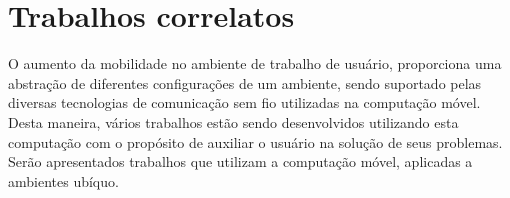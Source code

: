 \section{Trabalhos correlatos}
\label{sec:trabalhosRelacionados}

	O aumento da mobilidade no ambiente de trabalho de usuário, proporciona uma	abstração de diferentes 
	configurações de um ambiente, sendo suportado pelas diversas tecnologias de comunicação sem fio utilizadas na
	computação móvel. Desta maneira, vários trabalhos estão sendo desenvolvidos utilizando esta
	computação com o propósito de auxiliar o usuário na solução de seus problemas. Serão apresentados
	trabalhos que utilizam a computação móvel, aplicadas a ambientes ubíquo.
	 
	
	
	
	
